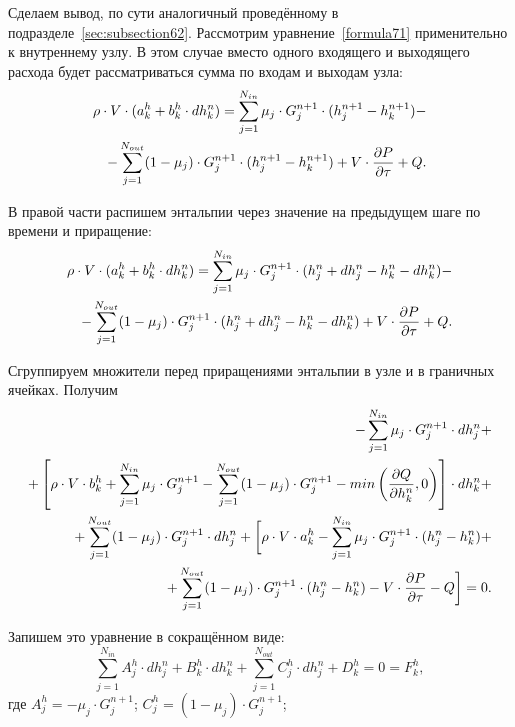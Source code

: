 
\label{sec:subsection72}
Сделаем вывод, по сути аналогичный проведённому в подразделе~\ref{sec:subsection62}. Рассмотрим уравнение~\eqref{formula71} применительно к внутреннему узлу. В этом случае вместо одного входящего и выходящего расхода будет рассматриваться сумма по входам и выходам узла:
\begin{align}
\label{formula77}
\rho\cdot V\cdot (a_k^h+b_k^h\cdot dh_k^n)=\sum_{j=1}^{N_{in}} \mu_j \cdot G_j^{n+1} \cdot (h_j^{n+1}-h_k^{n+1}) - \notag \\
-\sum_{j=1}^{N_{out}} (1-\mu_j)\cdot G_j^{n+1} \cdot (h_j^{n+1}-h_k^{n+1})  
+ V\cdot\frac{\partial P}{\partial\tau} + Q.
\end{align}

В правой части распишем энтальпии через значение на предыдущем шаге по времени и приращение:
\begin{align}
\label{formula78}
\rho\cdot V\cdot (a_k^h+b_k^h\cdot dh_k^n)=\sum_{j=1}^{N_{in}} \mu_j \cdot G_j^{n+1} \cdot (h_j^n+dh_j^n-h_k^n-dh_k^n) - \notag \\
-\sum_{j=1}^{N_{out}} (1-\mu_j)\cdot G_j^{n+1} \cdot (h_j^n+dh_j^n-h_k^n-dh_k^n)  
+ V\cdot\frac{\partial P}{\partial\tau} + Q.
\end{align}

Сгруппируем множители перед приращениями энтальпии в узле и в граничных ячейках. Получим
\begin{align}
\label{formula79}
-\sum_{j=1}^{N_{in}} \mu_j \cdot G_j^{n+1} \cdot dh_j^n + \notag \\
+ \left[\rho\cdot V\cdot b_k^h + \sum_{j=1}^{N_{in}} \mu_j \cdot G_j^{n+1} - \sum_{j=1}^{N_{out}} (1-\mu_j)\cdot G_j^{n+1} - min\left(\frac{\partial Q}{\partial h_k^n},0 \right) \right] \cdot dh_k^n + \notag \\
+ \sum_{j=1}^{N_{out}} (1-\mu_j)\cdot G_j^{n+1} \cdot dh_j^n + \bigg[\rho\cdot V\cdot a_k^h-\sum_{j=1}^{N_{in}} \mu_j \cdot G_j^{n+1} \cdot (h_j^n-h_k^n) + \notag \\
+ \sum_{j=1}^{N_{out}} (1-\mu_j)\cdot G_j^{n+1} \cdot (h_j^n-h_k^n)-V\cdot\frac{\partial P}{\partial\tau} - Q \bigg] = 0. 
\end{align}  

Запишем это уравнение в сокращённом виде:
\begin{equation}
\label{formula710}
\sum_{j=1}^{N_{in}} A_j^h \cdot dh_j^n + B_k^h \cdot dh_k^n + \sum_{j=1}^{N_{out}} C_j^h \cdot dh_j^n + D_k^h = 0 = F_k^h, 
\end{equation} 
где $A_j^h = -\mu_j \cdot G_j^{n+1}$; $C_j^h = (1-\mu_j)\cdot G_j^{n+1}$;

